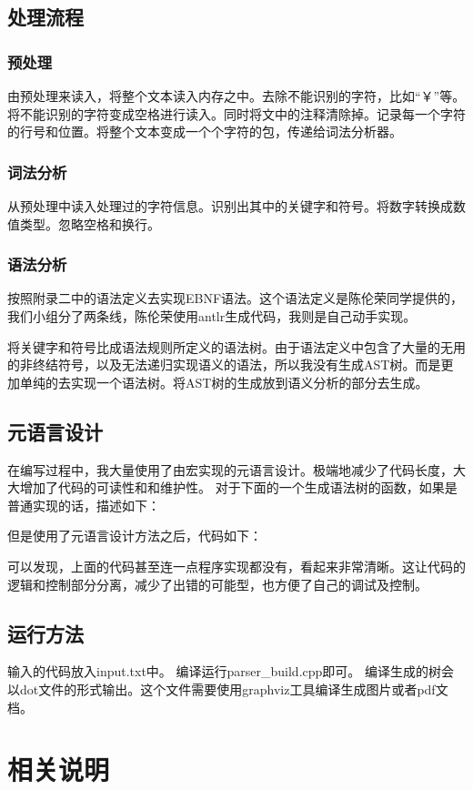 \documentclass[12pt,a4paper]{ctexrep}
\begin{document}
\section{处理流程}
\subsection{预处理}
由预处理来读入，将整个文本读入内存之中。去除不能识别的字符，比如“￥”等。将不能识别的字符变成空格进行读入。同时将文中的注释清除掉。记录每一个字符的行号和位置。将整个文本变成一个个字符的包，传递给词法分析器。
\subsection{词法分析}
从预处理中读入处理过的字符信息。识别出其中的关键字和符号。将数字转换成数值类型。忽略空格和换行。
\subsection{语法分析}
按照附录二中的语法定义去实现EBNF语法。这个语法定义是陈伦荣同学提供的，我们小组分了两条线，陈伦荣使用antlr生成代码，我则是自己动手实现。\par
将关键字和符号比成语法规则所定义的语法树。由于语法定义中包含了大量的无用的非终结符号，以及无法递归实现语义的语法，所以我没有生成AST树。而是更加单纯的去实现一个语法树。将AST树的生成放到语义分析的部分去生成。\par
\section{元语言设计}
在编写过程中，我大量使用了由宏实现的元语言设计。极端地减少了代码长度，大大增加了代码的可读性和和维护性。
对于下面的一个生成语法树的函数，如果是普通实现的话，描述如下：

但是使用了元语言设计方法之后，代码如下：

可以发现，上面的代码甚至连一点程序实现都没有，看起来非常清晰。这让代码的逻辑和控制部分分离，减少了出错的可能型，也方便了自己的调试及控制。
\section{运行方法}

输入的代码放入input.txt中。
编译运行parser\_build.cpp即可。
编译生成的树会以dot文件的形式输出。这个文件需要使用graphviz工具编译生成图片或者pdf文档。

\chapter{相关说明}
\end{document}
